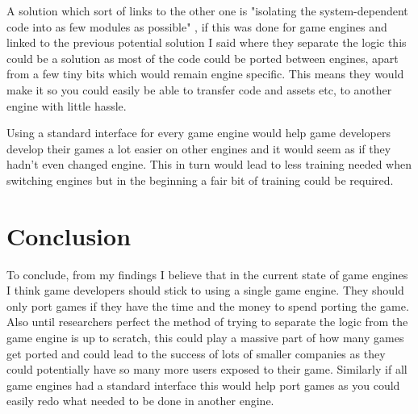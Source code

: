 \documentclass{scrartcl}
\begin{document}
A solution which sort of links to the other one is "isolating the system-dependent code into as few modules as possible" \cite{stern1978some}, if this was done for game engines and linked to the previous potential solution I said where they separate the logic this could be a solution as most of the code could be ported between engines, apart from a few tiny bits which would remain engine specific. This means they would make it so you could easily be able to transfer code and assets etc, to another engine with little hassle. 

Using a standard interface for every game engine \cite{binsubaih2006architecture} would help game developers develop their games a lot easier on other engines and it would seem as if they hadn't even changed engine. This in turn would lead to less training needed when switching engines but in the beginning a fair bit of training could be required.

\section{Conclusion}

To conclude, from my findings I believe that in the current state of game engines I think game developers should stick to using a single game engine. They should only port games if they have the time and the money to spend porting the game. Also until researchers perfect the method of trying to separate the logic from the game engine is up to scratch, this could play a massive part of how many games get ported and could lead to the success of lots of smaller companies as they could potentially have so many more users exposed to their game. Similarly if all game engines had a standard interface this would help port games as you could easily redo what needed to be done in another engine.



\end{document}
